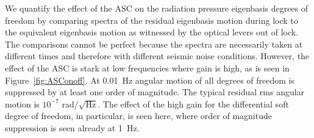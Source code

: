 
We quantify the effect of the ASC on the radiation pressure eigenbasis
degrees of freedom by comparing spectra of the residual eigenbasis
motion during lock to the equivalent eigenbasis motion as witnessed by
the optical levers out of lock. The comparisons cannot be perfect
because the spectra are necessarily taken at different times and
therefore with different seismic noise conditions. However, the effect
of the ASC is stark at low frequencies where gain is high, as is seen
in Figure~\ref{fig:ASConoff}. At 0.01~Hz angular motion of all degrees
of freedom is suppressed by at least one order of magnitude. The
typical residual rms angular motion is $10^{-7}$
rad/$\sqrt{\mathrm{Hz}}$. The effect of the high gain for the
differential soft degree of freedom, in particular, is seen here,
where order of magnitude suppression is seen already at 1~Hz.

